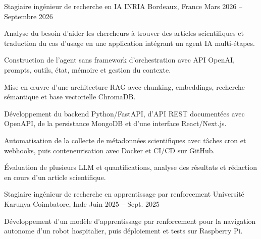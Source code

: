 
\begin{cventries}
  \cventry
    {Stagiaire ingénieur de recherche en IA}
    {INRIA}
    {Bordeaux, France}
    {Mars 2026 -- Septembre 2026}
    {
      \begin{cvitems}
        \item {Analyse du besoin d’aider les chercheurs à trouver des articles scientifiques et traduction du cas d’usage en une application intégrant un agent IA multi-étapes.}
        \item {Construction de l’agent sans framework d’orchestration avec API OpenAI, prompts, outils, état, mémoire et gestion du contexte.}
        \item {Mise en œuvre d’une architecture RAG avec chunking, embeddings, recherche sémantique et base vectorielle ChromaDB.}
        \item {Développement du backend Python/FastAPI, d’API REST documentées avec OpenAPI, de la persistance MongoDB et d’une interface React/Next.js.}
        \item {Automatisation de la collecte de métadonnées scientifiques avec tâches cron et webhooks, puis conteneurisation avec Docker et CI/CD sur GitHub.}
        \item {Évaluation de plusieurs LLM et quantifications, analyse des résultats et rédaction en cours d’un article scientifique.}
      \end{cvitems}
    }

  \cventry
    {Stagiaire ingénieur de recherche en apprentissage par renforcement}
    {Université Karunya}
    {Coimbatore, Inde}
    {Juin 2025 -- Sept. 2025}
    {
      \begin{cvitems}
        \item {Développement d’un modèle d’apprentissage par renforcement pour la navigation autonome d’un robot hospitalier, puis déploiement et tests sur Raspberry Pi.}
      \end{cvitems}
    }
\end{cventries}
